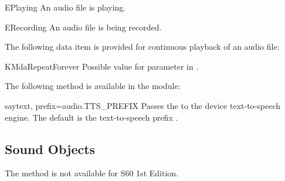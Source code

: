 \begin{datadesc}{EPlaying} 
An audio file is playing.
\end{datadesc}

\begin{datadesc}{ERecording}
An audio file is being recorded.
\end{datadesc}

The following data item is provided for continuous playback of an audio file:

\begin{datadesc}{KMdaRepeatForever}
Possible value for  parameter in .
\end{datadesc}

The following method is available in the  module:

\begin{funcdesc}{say}{text, prefix=audio.TTS_PREFIX}
Passes the  to the device text-to-speech engine. The default 
 is the text-to-speech prefix .
\end{funcdesc}

\subsection{Sound Objects}
\label{subsec:sound}

\begin{notice}[note]
The method  is not available for S60 1st 
Edition.
\end{notice}

